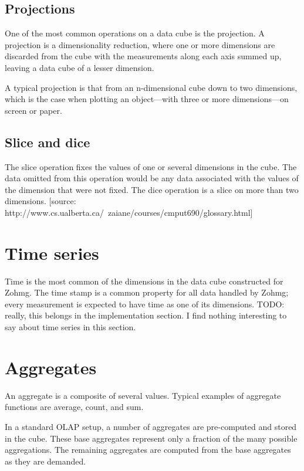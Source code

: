 \documentclass[a4paper,10pt]{book}
\begin{document}
\subsection{Projections}

One of the most common operations on a data cube is the projection. A projection is a dimensionality reduction, where one or more dimensions are discarded from the cube with the measurements along each axis summed up, leaving a data cube of a lesser dimension.

A typical projection is that from an n-dimensional cube down to two
dimensions, which is the case when plotting an object---with three or more
dimensions---on screen or paper.


\subsection{Slice and dice}

The slice operation fixes the values of one or several dimensions in the cube. The data omitted from this operation would be any data associated with the values of the dimension that were not fixed. The dice operation is a slice on more than two dimensions. [source: http://www.cs.ualberta.ca/~zaiane/courses/cmput690/glossary.html]



\section{Time series}

Time is the most common of the dimensions in the data cube constructed for Zohmg. The time stamp is a common property for all data handled by Zohmg; every measurement is expected to have time as one of its dimensions. TODO: really, this belongs in the implementation section. I find nothing interesting to say about time series in this section.



\section{Aggregates}

An aggregate is a composite of several values. Typical examples of
aggregate functions are average, count, and sum.

In a standard OLAP setup, a number of aggregates are pre-computed and
stored in the cube. These base aggregates represent only a fraction of the
many possible aggregations. The remaining aggregates are computed from the
base aggregates as they are demanded.
\end{document}
